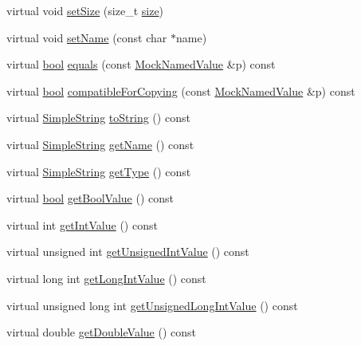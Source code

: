 \begin{DoxyCompactItemize}
\item 
virtual void \hyperlink{class_mock_named_value_a97deb13018c1b55b18bfe25a9e339e8d}{set\+Size} (size\+\_\+t \hyperlink{gst__avb__playbin_8c_a439227feff9d7f55384e8780cfc2eb82}{size})
\item 
virtual void \hyperlink{class_mock_named_value_ab3a256e7d9fad73fa57de7c1fedf51c5}{set\+Name} (const char $\ast$name)
\item 
virtual \hyperlink{avb__gptp_8h_af6a258d8f3ee5206d682d799316314b1}{bool} \hyperlink{class_mock_named_value_ae9e3bc5a05d1a0a62f2227d38135cc6a}{equals} (const \hyperlink{class_mock_named_value}{Mock\+Named\+Value} \&p) const 
\item 
virtual \hyperlink{avb__gptp_8h_af6a258d8f3ee5206d682d799316314b1}{bool} \hyperlink{class_mock_named_value_a8fba3c60ac4cf39df8227eb266a34370}{compatible\+For\+Copying} (const \hyperlink{class_mock_named_value}{Mock\+Named\+Value} \&p) const 
\item 
virtual \hyperlink{class_simple_string}{Simple\+String} \hyperlink{class_mock_named_value_af483ba199df3fea7a53d4f86f2ea0926}{to\+String} () const 
\item 
virtual \hyperlink{class_simple_string}{Simple\+String} \hyperlink{class_mock_named_value_ab9fb89f09ab681191e4eaa9221b42491}{get\+Name} () const 
\item 
virtual \hyperlink{class_simple_string}{Simple\+String} \hyperlink{class_mock_named_value_a149f9255153928a6fff62d1ff94d9dcf}{get\+Type} () const 
\item 
virtual \hyperlink{avb__gptp_8h_af6a258d8f3ee5206d682d799316314b1}{bool} \hyperlink{class_mock_named_value_a71b8fb9ffdc35fb1b08262c0a78dad38}{get\+Bool\+Value} () const 
\item 
virtual int \hyperlink{class_mock_named_value_abd16164fc39269075bdbbdae82fcc330}{get\+Int\+Value} () const 
\item 
virtual unsigned int \hyperlink{class_mock_named_value_aee5bfac973d1da4fec61c285d0808258}{get\+Unsigned\+Int\+Value} () const 
\item 
virtual long int \hyperlink{class_mock_named_value_a80098b212ec47f46fbea65c4eeca921d}{get\+Long\+Int\+Value} () const 
\item 
virtual unsigned long int \hyperlink{class_mock_named_value_a9d8410affdf87ec6fbf90e0f70e1e894}{get\+Unsigned\+Long\+Int\+Value} () const 
\item 
virtual double \hyperlink{class_mock_named_value_acafefa2f258c976d04f0cd78e2a6ad2c}{get\+Double\+Value} () const 
\item 

\end{DoxyCompactItemize}
